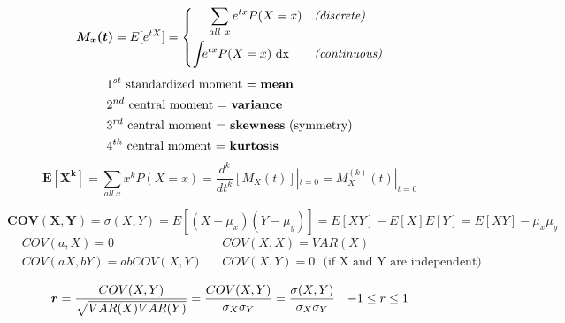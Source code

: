 \documentclass{article}
\begin{document}
$$ \boldsymbol{M_{x}(t)} = E[e^{tX}] = 
    \begin{dcases}
        \ \ \ \ \sum_{all\ x} e^{tx}P(X = x) & \textit{(discrete)} \\
        \int_{}e^{tx}P(X = x) \text{ dx} & \textit{(continuous)}
    \end{dcases}
$$
\begin{align*}
    &\text{$1^{st}$ standardized moment = \textbf{mean}} \\
    &\text{$2^{nd}$ central moment = \textbf{variance}} \\
    &\text{$3^{rd}$ central moment = \textbf{skewness} (symmetry)} \\
    &\text{$4^{th}$ central moment = \textbf{kurtosis}} 
\end{align*}
$$ \boldsymbol{E[X^{k}]} = \sum_{all\ x}x^{k}P(X = x) = \frac{d^{k}}{dt^{k}}[M_X(t)]|_{t=0} = M_X^{(k)}(t)|_{t=0} $$


\begin{equation*}
    \boldsymbol{COV(X,Y)} = \sigma(X,Y) = E[\left(X - \mu_x\right)\left(Y - \mu_y\right)] = E[XY] - E[X]E[Y]  = E[XY] - \mu_x\mu_y
\end{equation*}
\begin{align*}
    & COV(a,X) = 0 && COV(X,X) = VAR(X) \\
    & COV(aX,bY) = abCOV(X,Y) && COV(X,Y) = 0 \ \ \ \text{(if X and Y are independent)}
\end{align*}

\begin{equation*}
    \boldsymbol{r} = \frac{COV(X,Y)}{\sqrt{VAR(X)VAR(Y)}} = \frac{COV(X,Y)}{\sigma_X\sigma_Y} = \frac{\sigma(X,Y)}{\sigma_X\sigma_Y} \ \ \ {-1 \leq r \leq 1} \\
\end{equation*}
\end{document}
